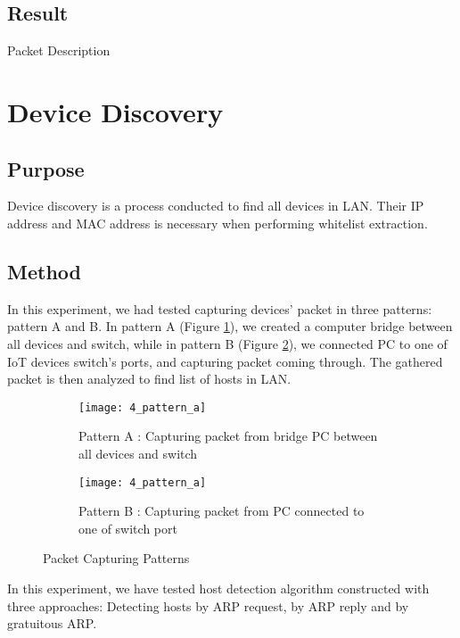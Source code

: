 \subsection{Result}
Packet Description

\section{Device Discovery}
\subsection{Purpose}
Device discovery is a process conducted to find all devices in LAN. Their IP address and MAC address is necessary when performing whitelist extraction.  

\subsection{Method}
In this experiment, we had tested capturing devices’ packet in three patterns: pattern A and B. In pattern A (Figure \ref{fig:s4_pattern_a}), we created a computer bridge between all devices and switch, while in pattern B (Figure \ref{fig:s4_pattern_b}), we connected PC to one of IoT devices switch’s ports, and capturing packet coming through. The gathered packet is then analyzed to find list of hosts in LAN.  

\begin{figure}
    \centering
    \begin{subfigure}[b]{0.35\textwidth}
        \centering
        \texttt{[image: 4\_pattern\_a]}
        \caption{Pattern A : Capturing packet from bridge PC between all devices and switch}
        \label{fig:s4_pattern_a}
    \end{subfigure}
    \hspace{1.5cm}
    \begin{subfigure}[b]{0.35\textwidth}
        \centering
        \texttt{[image: 4\_pattern\_a]}
        \caption{Pattern B : Capturing packet from PC connected to one of switch port}
        \label{fig:s4_pattern_b}
    \end{subfigure} 
    \caption{Packet Capturing Patterns}
    \label{fig:s4_packet_pattern}
\end{figure}

In this experiment, we have tested host detection algorithm constructed with three approaches: Detecting hosts by ARP request, by ARP reply and by gratuitous ARP. 

